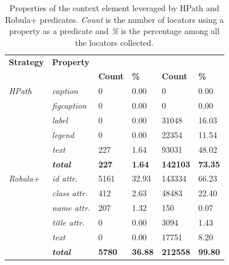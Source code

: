 \begin{table}
\centering
\caption{Properties of the context element leveraged by HPath and Robula+ predicates. \emph{Count} is the number of locators using a property as a predicate and \emph{\%} is the percentage among all the locators collected.}
\label{tab:hpath-results-properties}
\begin{tabular}{>{\raggedright}m{0.4in}>{\raggedright}m{0.5in}>{\raggedleft}m{0.25in} >{\raggedleft}m{0.2in}>{\raggedleft}m{0.4in} >{\raggedleft}m{0.2in}}
\toprule
\textbf{\scriptsize{Strategy}} & \textbf{\scriptsize{Property}} & \multicolumn{2}{c}{\textbf{\scriptsize{MISO LIMS}}} & \multicolumn{2}{c}{\textbf{\scriptsize{OpenOLAT}}}\tabularnewline
&   & \textbf{\scriptsize{Count}} & \textbf{\scriptsize{\%}} & \textbf{\scriptsize{Count}} & \textbf{\scriptsize{\%}}\tabularnewline
\toprule
\scriptsize{\textit{HPath}} & \scriptsize{\textit{caption}} & \scriptsize{0} & \scriptsize{0.00} & \scriptsize{0} & \scriptsize{0.00}\tabularnewline
& \scriptsize{\textit{figcaption}} & \scriptsize{0} & \scriptsize{0.00} & \scriptsize{0} & \scriptsize{0.00}\tabularnewline
& \scriptsize{\textit{label}} & \scriptsize{0} & \scriptsize{0.00} & \scriptsize{31048} & \scriptsize{16.03}\tabularnewline
& \scriptsize{\textit{legend}} & \scriptsize{0} & \scriptsize{0.00} & \scriptsize{22354} & \scriptsize{11.54}\tabularnewline
& \scriptsize{\textit{text}} & \scriptsize{227} & \scriptsize{1.64} & \scriptsize{93031} & \scriptsize{48.02}\tabularnewline
& \scriptsize{\textit{\textbf{total}}} & \scriptsize{\textbf{227}} & \scriptsize{\textbf{1.64}} & \scriptsize{\textbf{142103}} & \scriptsize{\textbf{73.35}}\tabularnewline
\hline
\scriptsize{\textit{Robula+}} & \scriptsize{\textit{id attr.}} & \scriptsize{5161} & \scriptsize{32.93} & \scriptsize{143334} & \scriptsize{66.23}\tabularnewline
& \scriptsize{\textit{class attr.}} & \scriptsize{412} & \scriptsize{2.63} & \scriptsize{48483} & \scriptsize{22.40}\tabularnewline
& \scriptsize{\textit{name attr.}} & \scriptsize{207} & \scriptsize{1.32} & \scriptsize{150} & \scriptsize{0.07}\tabularnewline
& \scriptsize{\textit{title attr.}} & \scriptsize{0} & \scriptsize{0.00} & \scriptsize{3094} & \scriptsize{1.43}\tabularnewline
& \scriptsize{\textit{text}} & \scriptsize{0} & \scriptsize{0.00} & \scriptsize{17751} & \scriptsize{8.20}\tabularnewline
& \scriptsize{\textit{\textbf{total}}} & \scriptsize{\textbf{5780}} & \scriptsize{\textbf{36.88}} & \scriptsize{\textbf{212558}} & \scriptsize{\textbf{99.80}}\tabularnewline
\bottomrule
\end{tabular}
\end{table}

